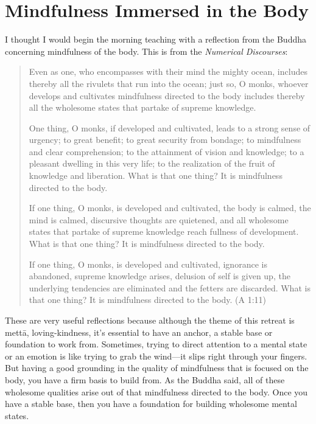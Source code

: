 \chapter{Mindfulness Immersed in the
Body}

I thought I would begin the morning teaching with a reflection from the
Buddha concerning mindfulness of the body. This is from the
\emph{Numerical Discourses}:

\begin{quotation}
Even as one, who encompasses with their mind the mighty ocean, includes
thereby all the rivulets that run into the ocean; just so, O monks,
whoever develops and cultivates mindfulness directed to the body
includes thereby all the wholesome states that partake of supreme
knowledge.

One thing, O monks, if developed and cultivated, leads to a strong sense
of urgency; to great benefit; to great security from bondage; to
mindfulness and clear comprehension; to the attainment of vision and
knowledge; to a pleasant dwelling in this very life; to the realization
of the fruit of knowledge and liberation. What is that one thing? It is
mindfulness directed to the body.

If one thing, O monks, is developed and cultivated, the body is calmed,
the mind is calmed, discursive thoughts are quietened, and all wholesome
states that partake of supreme knowledge reach fullness of development.
What is that one thing? It is mindfulness directed to the body.

If one thing, O monks, is developed and cultivated, ignorance is
abandoned, supreme knowledge arises, delusion of self is given up, the
underlying tendencies are eliminated and the fetters are discarded. What
is that one thing? It is mindfulness directed to the body. (A 1:11)
\end{quotation}

These are very useful reflections because although the theme of this
retreat is mettā, loving-kindness, it’s essential to have an anchor, a
stable base or foundation to work from. Sometimes, trying to direct
attention to a mental state or an emotion is like trying to grab the
wind—it slips right through your fingers. But having a good grounding in
the quality of mindfulness that is focused on the body, you have a firm
basis to build from. As the Buddha said, all of these wholesome
qualities arise out of that mindfulness directed to the body. Once you
have a stable base, then you have a foundation for building wholesome
mental states.

